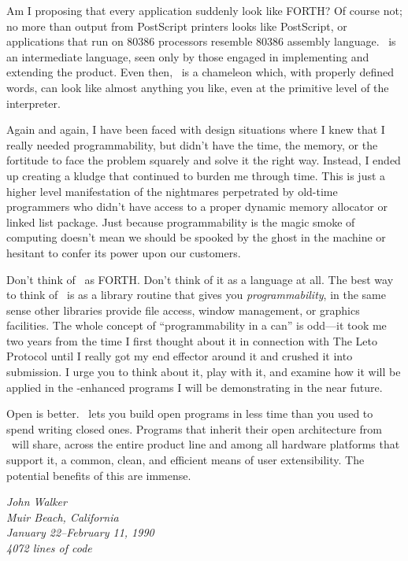 \documentclass[twocolumn]{article}
\begin{document}
Am I proposing that every application suddenly look like FORTH\@?
Of course not; no more than output from PostScript printers looks
like PostScript, or applications that run on 80386 processors resemble
80386 assembly language.  \atlast\ is an intermediate language, seen
only by those engaged in implementing and extending the product.  Even
then, \atlast\ is a chameleon which, with properly defined words, can
look like almost anything you like, even at the primitive level of the
interpreter.

Again and again, I have been faced with design situations where I
knew that I really needed programmability, but didn't have the time,
the memory, or the fortitude to face the problem squarely and solve it
the right way.  Instead, I ended up creating a kludge that continued
to burden me through time.  This is just a higher level manifestation
of the nightmares perpetrated by old-time programmers who didn't have
access to a proper dynamic memory allocator or linked list package.
Just because programmability is the magic smoke of computing doesn't
mean we should be spooked by the ghost in the machine or hesitant to
confer its power upon our customers.

Don't think of \atlast\ as FORTH\@.  Don't think of it as a language at
all.  The best way to think of \atlast\ is as a library routine that
gives you {\em programmability}, in the same sense other libraries
provide file access, window management, or graphics facilities.  The
whole concept of ``programmability in a can'' is odd---it took me two
years from the time I first thought about it in connection with The
Leto Protocol until I really got my end effector around it and crushed
it into submission.  I urge you to think about it, play with it, and
examine how it will be applied in the \atlast -enhanced programs I will
be demonstrating in the near future.

Open is better.  \atlast\ lets you build open programs in less time
than you used to spend writing closed ones.
Programs that inherit their open architecture from \atlast\ will share,
across the entire product line and among all hardware platforms that
support it, a common, clean, and efficient means of user
extensibility.  The potential benefits of this are immense.

{
\raggedleft \em
John Walker\\
Muir Beach, California\\
January 22--February 11, 1990\\
4072 lines of code\\
}
\end{document}
